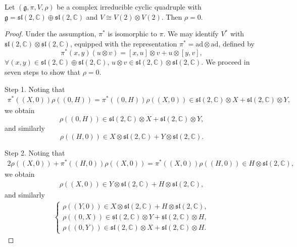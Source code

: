 \documentclass[10pt,a4paper]{amsart}
\begin{document}
\begin{lem}\label{5.2-lem2}
Let $(\mathfrak{g},\pi,V,\rho)$ be a complex irreducible cyclic quadruple with $\mathfrak{g}=\mathfrak{sl}(2,\mathbb{C})\oplus\mathfrak{sl}(2,\mathbb{C})$
and  $V\cong V(2)\otimes V(2)$.  Then $\rho=0$.
\end{lem}

\begin{proof}
Under the assumption, $\pi^{\ast}$ is isomorphic to $\pi$.
We may identify $V^{\ast}$ with $\mathfrak{sl}(2,\mathbb{C})\otimes\mathfrak{sl}(2,\mathbb{C})$, equipped with the representation $\pi^{\ast}=\mathrm{ad}\otimes \mathrm{ad}$, defined by
$$\pi^{\ast}(x,y)(u\otimes v)=[x,u]\otimes v+u\otimes [y,v],$$
$\forall (x,y)\in \mathfrak{sl}(2,\mathbb{C})\oplus\mathfrak{sl}(2,\mathbb{C})$, $u\otimes v\in \mathfrak{sl}(2,\mathbb{C})\otimes \mathfrak{sl}(2,\mathbb{C})$.
We proceed in seven steps to show that $\rho=0$.

Step 1. Noting that
\begin{eqnarray*}
\pi^{\ast}((X,0))\rho((0,H))=\pi^{\ast}((0,H))\rho((X,0))\in \mathfrak{sl}(2,\mathbb{C}) \otimes X+\mathfrak{sl}(2,\mathbb{C})\otimes Y,
\end{eqnarray*}
we obtain
$$\rho((0,H))\in \mathfrak{sl}(2,\mathbb{C}) \otimes X+\mathfrak{sl}(2,\mathbb{C})\otimes Y,$$
and similarly
$$\rho((H,0))\in X\otimes\mathfrak{sl}(2,\mathbb{C}) +Y\otimes\mathfrak{sl}(2,\mathbb{C}).$$

Step 2. Noting that
\begin{eqnarray*}
2\rho((X,0))+\pi^{\ast}((H,0))\rho((X,0))=\pi^{\ast}((X,0))\rho((H,0))\in H\otimes \mathfrak{sl}(2,\mathbb{C}),
\end{eqnarray*}
we obtain
\begin{eqnarray*}
\rho((X,0))\in Y\otimes\mathfrak{sl}(2,\mathbb{C}) +H\otimes\mathfrak{sl}(2,\mathbb{C}),
\end{eqnarray*}
and similarly
\begin{eqnarray*}
\begin{cases}
\rho((Y,0))\in X\otimes\mathfrak{sl}(2,\mathbb{C}) +H\otimes\mathfrak{sl}(2,\mathbb{C}),\\
\rho((0,X))\in \mathfrak{sl}(2,\mathbb{C}) \otimes Y+\mathfrak{sl}(2,\mathbb{C})\otimes H,\\
\rho((0,Y))\in \mathfrak{sl}(2,\mathbb{C}) \otimes X+\mathfrak{sl}(2,\mathbb{C})\otimes H.
\end{cases}
\end{eqnarray*}


\end{proof}
\end{document}

